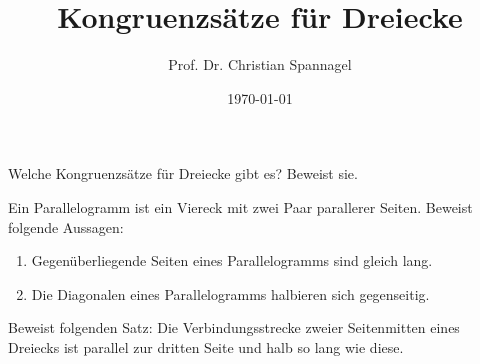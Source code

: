 \documentclass{cssheet}
\title{Kongruenzsätze für Dreiecke}
\author{Prof. Dr. Christian Spannagel}
\date{\today}
\begin{document}
\printtitle

\begin{aufgabe}[Kongruenzsätze]
	Welche Kongruenzsätze für Dreiecke gibt es? Beweist sie.
\end{aufgabe}

\begin{aufgabe}
	Ein Parallelogramm ist ein Viereck mit zwei Paar parallerer Seiten. Beweist folgende Aussagen:
	\begin{enumerate}
		\item Gegenüberliegende Seiten eines Parallelogramms sind gleich lang.
		\item Die Diagonalen eines Parallelogramms halbieren sich gegenseitig.
	\end{enumerate}
\end{aufgabe}

\begin{aufgabe}
	Beweist folgenden Satz: Die Verbindungsstrecke zweier Seitenmitten eines Dreiecks ist parallel zur dritten Seite und halb so lang wie diese.
\end{aufgabe}

\vspace*{10mm}

\printlicense

\printsocials
\end{document}
